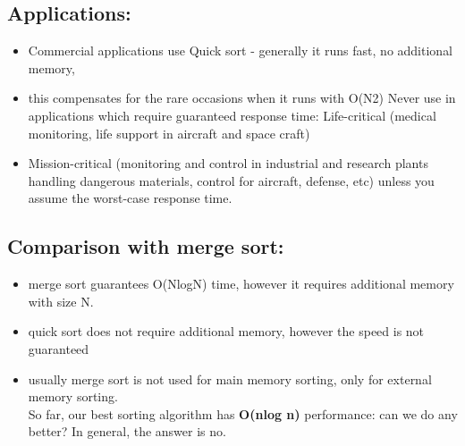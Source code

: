 \documentclass{article}
\begin{document}
	\subsection{ Applications:}
	\begin{itemize}
		\item Commercial applications use Quick sort - generally it runs fast, no additional memory, 
		\item this compensates for the rare occasions when it runs with O(N2)
		Never use in applications which require guaranteed response time:
		Life-critical (medical monitoring, life support in aircraft and space craft) 
		\item Mission-critical (monitoring and control in industrial and research plants handling dangerous materials, control for aircraft, defense, etc) 
		unless you assume the worst-case response time.
	\end{itemize}      
	\subsection{ Comparison with merge sort: }
	\begin{itemize}
		\item 
		merge sort guarantees O(NlogN) time, however it requires additional memory with size N. 
		\item quick sort does not require additional memory, however the speed is not guaranteed 
		\item usually merge sort is not used for main memory sorting, only for external memory sorting. \\
		So far, our best sorting algorithm has \textbf{O(nlog n)} performance: can we do any better? 
		In general, the answer is no.
	\end{itemize}
	
	
\end{document}
